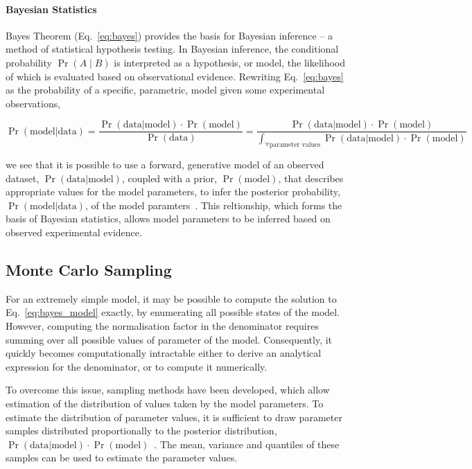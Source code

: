 \paragraph{Bayesian Statistics}
Bayes Theorem (Eq.~\ref{eq:bayes}) provides the basis for Bayesian inference -- a method of statistical hypothesis testing. In Bayesian inference, the conditional probability $\Pr(A \mid B)$ is interpreted as a hypothesis, or model, the likelihood of which is evaluated based on observational evidence. Rewriting Eq.~\ref{eq:bayes} as the probability of a specific, parametric, model given some experimental observations, 

\begin{equation}
\Pr(\text{model}|\text{data}) = \frac{\Pr(\text{data}|\text{model}) \cdot \Pr(\text{model})}{\Pr(\text{data})} = \frac{\Pr(\text{data}|\text{model}) \cdot \Pr(\text{model})}{\int_{\forall \text{parameter values}}\Pr(\text{data}|\text{model}) \cdot \Pr(\text{model})} 
\label{eq:bayes_model}
\end{equation}

we see that it is possible to use a forward, generative model of an observed dataset, $\Pr(\text{data}|\text{model})$, coupled with a prior, $\Pr(\text{model})$, that describes appropriate values for the model parameters, to infer the posterior probability, $\Pr(\text{model}|\text{data})$, of the model paramters~\cite{barberBRML2012}. This reltionship, which forms the basis of Bayesian statistics, allows model parameters to be inferred based on observed experimental evidence.

\subsection{Monte Carlo Sampling}
For an extremely simple model, it may be possible to compute the solution to Eq.~\ref{eq:bayes_model} exactly, by enumerating all possible states of the model. However, computing the normalisation factor in the denominator requires summing over all possible values of parameter of the model. Consequently, it quickly becomes computationally intractable either to derive an analytical expression for the denominator, or to compute it numerically. 

To overcome this issue, sampling methods have been developed, which allow estimation of the distribution of values taken by the model parameters. To estimate the distribution of parameter values, it is sufficient to draw parameter samples distributed proportionally to the posterior distribution, $\Pr(\text{data}|\text{model}) \cdot \Pr(\text{model})$~\cite{hastings70}. The mean, variance and quantiles of these samples can be used to estimate the parameter values.

